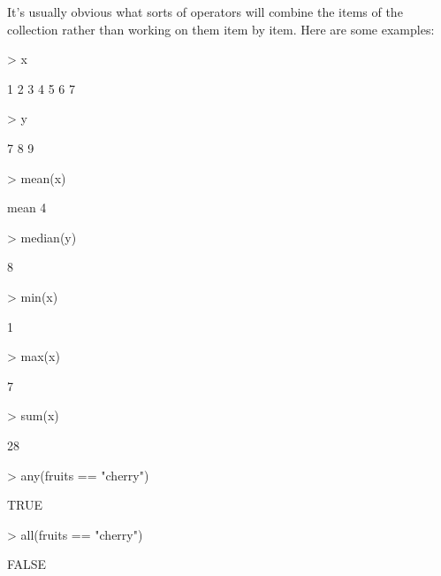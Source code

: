 It's usually obvious what sorts of operators will combine the items
of the collection rather than working on them item by item.  Here are
some examples:
\begin{Schunk}
\begin{Sinput}
> x
\end{Sinput}
\begin{Soutput}
[1] 1 2 3 4 5 6 7
\end{Soutput}
\begin{Sinput}
> y
\end{Sinput}
\begin{Soutput}
[1] 7 8 9
\end{Soutput}
\begin{Sinput}
> mean(x)
\end{Sinput}
\begin{Soutput}
mean 
   4 
\end{Soutput}
\begin{Sinput}
> median(y)
\end{Sinput}
\begin{Soutput}
[1] 8
\end{Soutput}
\begin{Sinput}
> min(x)
\end{Sinput}
\begin{Soutput}
[1] 1
\end{Soutput}
\begin{Sinput}
> max(x)
\end{Sinput}
\begin{Soutput}
[1] 7
\end{Soutput}
\begin{Sinput}
> sum(x)
\end{Sinput}
\begin{Soutput}
[1] 28
\end{Soutput}
\begin{Sinput}
> any(fruits == "cherry")
\end{Sinput}
\begin{Soutput}
[1] TRUE
\end{Soutput}
\begin{Sinput}
> all(fruits == "cherry")
\end{Sinput}
\begin{Soutput}
[1] FALSE
\end{Soutput}
\end{Schunk}



